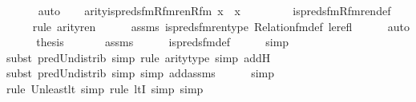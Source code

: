 \begin{isabellebody}
\ \ \ \ \isamarkupfalse%
\ auto\isanewline
\isanewline
\ \ \isamarkupfalse%
\ {\isachardoublequoteopen}arity{\isacharparenleft}{\kern0pt}is{\isacharunderscore}{\kern0pt}preds{\isacharunderscore}{\kern0pt}fm{\isacharunderscore}{\kern0pt}Rfm{\isacharunderscore}{\kern0pt}ren{\isacharparenleft}{\kern0pt}Rfm{\isacharcomma}{\kern0pt}\ x{\isacharparenright}{\kern0pt}{\isacharparenright}{\kern0pt}\ {\isasymle}\ x\ {\isacharhash}{\kern0pt}{\isacharplus}{\kern0pt}\ {}{\isachardoublequoteclose}\ \isanewline
\ \ \ \ \isamarkupfalse%
\ is{\isacharunderscore}{\kern0pt}preds{\isacharunderscore}{\kern0pt}fm{\isacharunderscore}{\kern0pt}Rfm{\isacharunderscore}{\kern0pt}ren{\isacharunderscore}{\kern0pt}def\isanewline
\ \ \ \ \isamarkupfalse%
{\isacharparenleft}{\kern0pt}rule\ arity{\isacharunderscore}{\kern0pt}ren{\isacharparenright}{\kern0pt}\isanewline
\ \ \ \ \isamarkupfalse%
\ assms\ is{\isacharunderscore}{\kern0pt}preds{\isacharunderscore}{\kern0pt}fm{\isacharunderscore}{\kern0pt}ren{\isacharunderscore}{\kern0pt}type\ Relation{\isacharunderscore}{\kern0pt}fm{\isacharunderscore}{\kern0pt}def\ le{\isacharunderscore}{\kern0pt}refl\isanewline
\ \ \ \ \isamarkupfalse%
\ auto\isanewline
\isanewline
\ \ \isamarkupfalse%
\ \isamarkupfalse%
\ {\isacharquery}{\kern0pt}thesis\ \isanewline
\ \ \ \ \isamarkupfalse%
\ assms\isanewline
\ \ \ \ \isamarkupfalse%
\ is{\isacharunderscore}{\kern0pt}preds{\isacharunderscore}{\kern0pt}fm{\isacharunderscore}{\kern0pt}def\isanewline
\ \ \ \ \isamarkupfalse%
\ simp\ \isanewline
\ \ \ \ \isamarkupfalse%
{\isacharparenleft}{\kern0pt}subst\ pred{\isacharunderscore}{\kern0pt}Un{\isacharunderscore}{\kern0pt}distrib{\isacharcomma}{\kern0pt}\ simp{\isacharcomma}{\kern0pt}\ rule\ arity{\isacharunderscore}{\kern0pt}type{\isacharcomma}{\kern0pt}\ simp\ add{\isacharcolon}{\kern0pt}H{\isacharparenright}{\kern0pt}\isanewline
\ \ \ \ \isamarkupfalse%
{\isacharparenleft}{\kern0pt}subst\ pred{\isacharunderscore}{\kern0pt}Un{\isacharunderscore}{\kern0pt}distrib{\isacharcomma}{\kern0pt}\ simp{\isacharcomma}{\kern0pt}\ simp\ add{\isacharcolon}{\kern0pt}assms{\isacharparenright}{\kern0pt}\isanewline
\ \ \ \ \isamarkupfalse%
\ simp\isanewline
\ \ \ \ \isamarkupfalse%
{\isacharparenleft}{\kern0pt}rule\ Un{\isacharunderscore}{\kern0pt}least{\isacharunderscore}{\kern0pt}lt{\isacharcomma}{\kern0pt}\ simp{\isacharcomma}{\kern0pt}\ rule\ ltI{\isacharcomma}{\kern0pt}\ simp{\isacharcomma}{\kern0pt}\ simp{\isacharparenright}{\kern0pt}\isanewline

\end{isabellebody}

